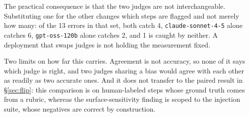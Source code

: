 The practical consequence is that the two judges are not interchangeable.
Substituting one for the other changes which steps are flagged and not merely
how many: of the 13 errors in that set, both catch 4,
\texttt{claude-sonnet-4-5} alone catches 6, \texttt{gpt-oss-120b} alone catches
2, and 1 is caught by neither. A deployment that swaps judges is not holding
the measurement fixed.

Two limits on how far this carries. Agreement is not accuracy, so none of it
says which judge is right, and two judges sharing a bias would agree with each
other as readily as two accurate ones. And it does not transfer to the paired
result in \S\ref{sec:flip}: this comparison is on human-labeled steps whose
ground truth comes from a rubric, whereas the surface-sensitivity finding is
scoped to the injection suite, whose negatives are correct by construction.
